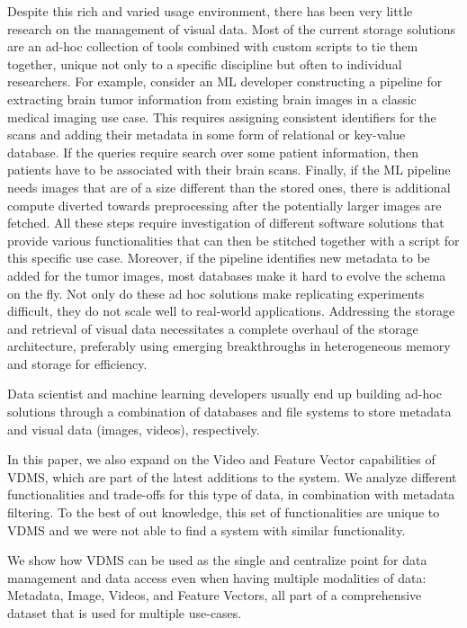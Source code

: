 Despite this rich and varied usage environment, there has been very little
research on the management of visual data.
Most of the current storage solutions are
an ad-hoc collection of tools combined with custom scripts to tie them
together, unique not only to a specific discipline but often to individual
researchers. For example, consider an ML developer constructing a pipeline
for extracting brain tumor information from existing brain images in a
classic medical imaging use case. This requires assigning consistent
identifiers for the scans and adding their metadata in
some form of relational or key-value database. If the queries require
search over some patient information, then patients have to be associated
with their brain scans. Finally, if the ML pipeline needs images that
are of a size different than the stored ones, there is additional compute
diverted towards preprocessing after the potentially larger images are
fetched. All these steps require investigation of different software
solutions that provide various functionalities that can then be stitched
together with a script for this specific use case.
Moreover, if the pipeline identifies
new metadata to be added for the tumor images, most databases make it
hard to evolve the schema on the fly.
Not only do these ad hoc solutions make replicating experiments
difficult, they do not scale well to real-world applications.
Addressing the storage and retrieval of visual data necessitates a complete
overhaul of the storage architecture,
preferably using emerging breakthroughs in
heterogeneous memory and storage for efficiency.

Data scientist and machine learning developers usually end up building ad-hoc
solutions through a combination of databases and file systems to store metadata
and visual data (images, videos), respectively.

In this paper, we also expand on the Video and Feature Vector capabilities of
VDMS, which are part of the latest additions to the system.
We analyze different functionalities and trade-offs for this type of data,
in combination with metadata filtering. To the best of out knowledge, this
set of functionalities are unique to VDMS and we were not able to find a system
with similar functionality.

We show how VDMS can be used as the single and centralize point for data
management and data access even when having multiple modalities of data:
Metadata, Image, Videos, and Feature Vectors, all part of a comprehensive
dataset that is used for multiple use-cases.

